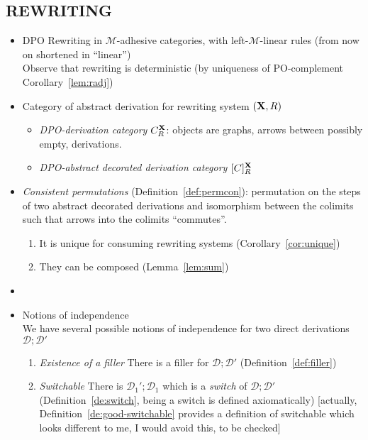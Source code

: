 \documentclass[a4paper,UKenglish,cleveref,pdftex,thm-restate,numberwithinsect]{lipics-v2021}
\newcommand{\dpo}{\textsc{dpo}}
\def\R{\mathsf{R}}
\def\X{\textbf {\textup{X}}}
\newcommand{\dder}[1]{\mathscr{#1}}
\def\dpo{\mathsf{C}^{\X}_R}
\def\dpi{[\mathsf{C}]^{\X}_R}
\begin{document}
\subsection*{REWRITING}
\begin{itemize}
\item DPO Rewriting in $\mathcal{M}$-adhesive categories, with left-$\mathcal{M}$-linear rules (from now on shortened in ``linear'')\\
  Observe that rewriting is deterministic (by uniqueness of
  PO-complement Corollary~\ref{lem:radj})
  
\item Category of abstract derivation for rewriting system $(\X, \R)$
  \begin{itemize}
  \item \emph{DPO-derivation category} $\dpo$: objects are graphs,
    arrows between possibly empty, derivations.
  \item \emph{DPO-abstract decorated derivation category} $\dpi$
  \end{itemize}
  
  
  
\item \emph{Consistent permutations} (Definition~\ref{def:permcon}):
  permutation on the steps of two abstract decorated derivations and
  isomorphism between the colimits such that arrows into the colimits
  ``commutes''.
  \begin{enumerate}
  \item It is unique for consuming
    rewriting systems (Corollary~\ref{cor:unique})
  \item They can be composed
    (Lemma~\ref{lem:sum})
  \end{enumerate}
\item
  
  
\item Notions of independence\\ We have several
  possible notions of independence for two direct derivations $\dder{D}
  ; \dder{D'}$
  \begin{enumerate}
    
  \item \emph{Existence of a filler} There
is a filler for $\dder{D} ; \dder{D'}$ (Definition~\ref{def:filler})

\item \emph{Switchable} There is
  $\dder{D}_1' ; \dder{D}_1$ which is a \emph{switch} of $\dder{D} ;
  \dder{D'}$ (Definition~\ref{de:switch}, being a switch is defined
  axiomatically) [actually, Definition~\ref{de:good-switchable} provides
  a definition of switchable which looks different to me, I would avoid
  this, to be checked]
  

\end{enumerate}
\end{itemize}
\end{document}
